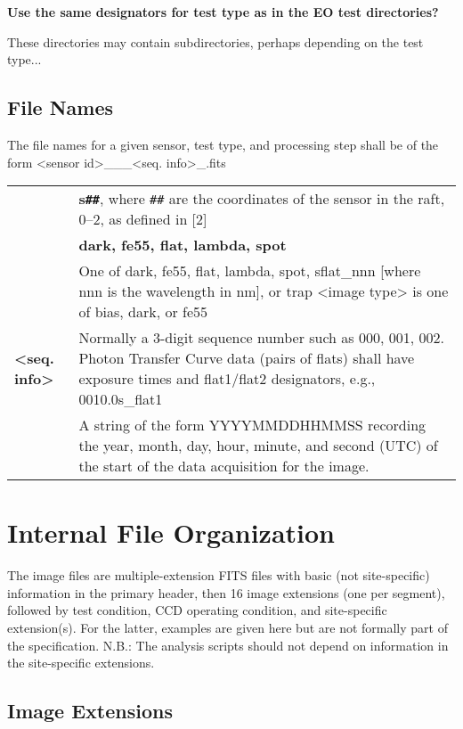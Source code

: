 \documentclass{article}[12pt]
\begin{document}
{\bf Use the same designators for test type as in the EO test directories?}

These directories may contain subdirectories, perhaps depending on the test type...


\subsection{File Names}

The file names for a given sensor, test type, and processing step shall be of the form
<sensor id>\_<test type>\_<image type>\_<seq. info>\_<time stamp>.fits

\begin{tabular}{| l | l |}
\hline
{\bf <sensor id>} & {\bf s{\tt \#\#}}, where {\tt \#\#} are the coordinates of the sensor in the raft, 0--2, as defined in [2] \\
{\bf <test type>} & {\bf dark, fe55, flat, lambda, spot} \\
{\bf <image type>} & One of dark, fe55, flat, lambda, spot, sflat\_nnn [where nnn is the wavelength in nm], or trap
<image type> is one of bias, dark, or fe55 \\
{\bf <seq. info>} & Normally a 3-digit sequence number such as 000, 001, 002.  Photon Transfer Curve data (pairs of flats) shall have exposure times and flat1/flat2 designators, e.g., 0010.0s\_flat1 \\
{\bf <time stamp>} & A string of the form YYYYMMDDHHMMSS recording the year, month, day, hour, minute, and second (UTC) of the start of the data acquisition for the image. \\
\hline
\end{tabular}

\section{Internal File Organization}

The image files are multiple-extension FITS files with basic (not site-specific) information in the primary header, then 16 image extensions (one per segment), followed by test condition, CCD operating condition, and site-specific extension(s).  For the latter, examples are given here but are not formally part of the specification.  N.B.: The analysis scripts should not depend on information in the site-specific extensions.

\subsection{Image Extensions}
\end{document}

